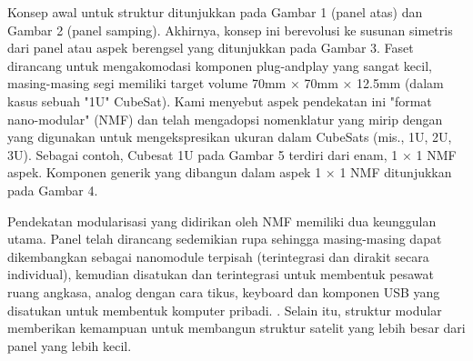 Konsep awal untuk struktur ditunjukkan pada Gambar 1 (panel atas) dan Gambar 2 (panel samping). Akhirnya, konsep ini berevolusi ke susunan simetris dari panel atau aspek berengsel yang ditunjukkan pada Gambar 3. Faset dirancang untuk mengakomodasi komponen plug-andplay yang sangat kecil, masing-masing segi memiliki target volume 70mm × 70mm × 12.5mm (dalam kasus sebuah "1U" CubeSat). Kami menyebut aspek pendekatan ini "format nano-modular" (NMF) dan telah mengadopsi nomenklatur yang mirip dengan yang digunakan untuk mengekspresikan ukuran dalam CubeSats (mis., 1U, 2U, 3U). Sebagai contoh, Cubesat 1U pada Gambar 5 terdiri dari enam, 1 × 1 NMF aspek. Komponen generik yang dibangun dalam aspek 1 × 1 NMF ditunjukkan pada Gambar 4.

Pendekatan modularisasi yang didirikan oleh NMF memiliki dua keunggulan utama. Panel telah dirancang sedemikian rupa sehingga masing-masing dapat dikembangkan sebagai nanomodule terpisah (terintegrasi dan dirakit secara individual), kemudian disatukan dan terintegrasi untuk membentuk pesawat ruang angkasa, analog dengan cara tikus, keyboard dan komponen USB yang disatukan untuk membentuk komputer pribadi. . Selain itu, struktur modular memberikan kemampuan untuk membangun struktur satelit yang lebih besar dari panel yang lebih kecil.